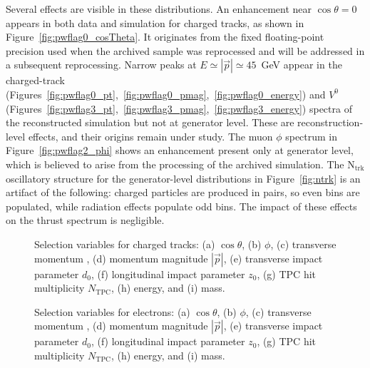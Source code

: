 Several effects are visible in these distributions. An enhancement near $\cos\theta=0$
appears in both data and simulation for charged tracks, as shown in Figure~\ref{fig:pwflag0_cosTheta}. It originates from the fixed floating-point precision used when the archived sample was reprocessed and will be addressed in a subsequent reprocessing. Narrow peaks at $E\simeq|\vec{p}|\simeq45$~GeV appear in the charged-track (Figures~\ref{fig:pwflag0_pt},~\ref{fig:pwflag0_pmag},~\ref{fig:pwflag0_energy}) and $V^{0}$ (Figures~\ref{fig:pwflag3_pt},~\ref{fig:pwflag3_pmag},~\ref{fig:pwflag3_energy}) spectra of the reconstructed simulation but not at generator level. These are reconstruction-level effects, and their origins remain under study. The muon $\phi$ spectrum in Figure~\ref{fig:pwflag2_phi} shows an enhancement present only at generator level, which is believed to arise from the processing of the archived simulation. The $\mathrm{N}_\mathrm{trk}$ oscillatory structure for the generator-level distributions in Figure~\ref{fig:ntrk} is an artifact of the following: charged particles are produced in pairs, so even bins are populated, while radiation effects populate odd bins. The impact of these effects on the thrust spectrum is negligible.


\begin{figure}[p]
\centering
\vspace*{\fill}
\hfill
{}\hfill
{}
\vfill
{}\hfill
{}\hfill
{}
\vfill
{}\hfill
{}\hfill
{}
\vspace*{\fill}
\caption{Selection variables for charged tracks: (a) $\cos\theta$, (b) $\phi$, (c) transverse momentum \pT, (d) momentum magnitude $|\vec{p}|$, (e) transverse impact parameter $d_{0}$, (f) longitudinal impact parameter $z_{0}$, (g) TPC hit multiplicity $N_{\mathrm{TPC}}$, (h) energy, and (i) mass.}
\label{fig:pwflag0_full}
\end{figure}


\begin{figure}[p]
\centering
\vspace*{\fill}
\hfill
{}\hfill
{}
\vfill
{}\hfill
{}\hfill
{}
\vfill
{}\hfill
{}\hfill
{}
\vspace*{\fill}
\caption{Selection variables for electrons: (a) $\cos\theta$, (b) $\phi$, (c) transverse momentum \pT, (d) momentum magnitude $|\vec{p}|$, (e) transverse impact parameter $d_{0}$, (f) longitudinal impact parameter $z_{0}$, (g) TPC hit multiplicity $N_{\mathrm{TPC}}$, (h) energy, and (i) mass.}
\label{fig:pwflag1_full}
\end{figure}



